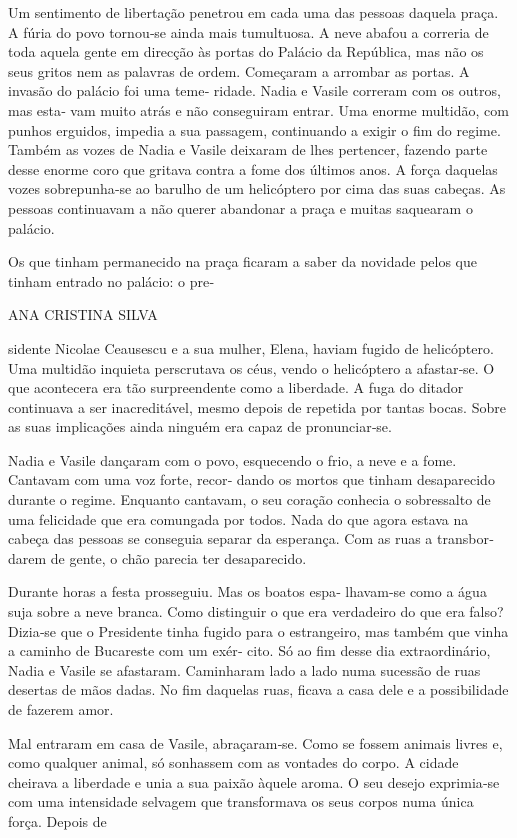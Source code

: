 Um sentimento de libertação penetrou em cada uma das pessoas daquela
praça. A fúria do povo tornou‑se ainda mais tumultuosa. A neve abafou a
correria de toda aquela gente em direcção às portas do Palácio da
República, mas não os seus gritos nem as palavras de ordem. Começaram a
arrombar as portas. A invasão do palácio foi uma teme‑ ridade. Nadia e
Vasile correram com os outros, mas esta‑ vam muito atrás e não
conseguiram entrar. Uma enorme multidão, com punhos erguidos, impedia a
sua passagem, continuando a exigir o fim do regime. Também as vozes de
Nadia e Vasile deixaram de lhes pertencer, fazendo parte desse enorme
coro que gritava contra a fome dos últimos anos. A força daquelas vozes
sobrepunha‑se ao barulho de um helicóptero por cima das suas cabeças. As
pessoas continuavam a não querer abandonar a praça e muitas saquearam o
palácio.

Os que tinham permanecido na praça ficaram a saber da novidade pelos que
tinham entrado no palácio: o pre‑

ANA CRISTINA SILVA

sidente Nicolae Ceausescu e a sua mulher, Elena, haviam fugido de
helicóptero. Uma multidão inquieta perscrutava os céus, vendo o
helicóptero a afastar‑se. O que acontecera era tão surpreendente como a
liberdade. A fuga do ditador continuava a ser inacreditável, mesmo
depois de repetida por tantas bocas. Sobre as suas implicações ainda
ninguém era capaz de pronunciar‑se.

Nadia e Vasile dançaram com o povo, esquecendo o frio, a neve e a fome.
Cantavam com uma voz forte, recor‑ dando os mortos que tinham
desaparecido durante o regime. Enquanto cantavam, o seu coração conhecia
o sobressalto de uma felicidade que era comungada por todos. Nada do que
agora estava na cabeça das pessoas se conseguia separar da esperança.
Com as ruas a transbor‑ darem de gente, o chão parecia ter desaparecido.

Durante horas a festa prosseguiu. Mas os boatos espa‑ lhavam‑se como a
água suja sobre a neve branca. Como distinguir o que era verdadeiro do
que era falso? Dizia‑se que o Presidente tinha fugido para o
estrangeiro, mas também que vinha a caminho de Bucareste com um exér‑
cito. Só ao fim desse dia extraordinário, Nadia e Vasile se afastaram.
Caminharam lado a lado numa sucessão de ruas desertas de mãos dadas. No
fim daquelas ruas, ficava a casa dele e a possibilidade de fazerem amor.

Mal entraram em casa de Vasile, abraçaram‑se. Como se fossem animais
livres e, como qualquer animal, só sonhassem com as vontades do corpo. A
cidade cheirava a liberdade e unia a sua paixão àquele aroma. O seu
desejo exprimia‑se com uma intensidade selvagem que transformava os seus
corpos numa única força. Depois de

